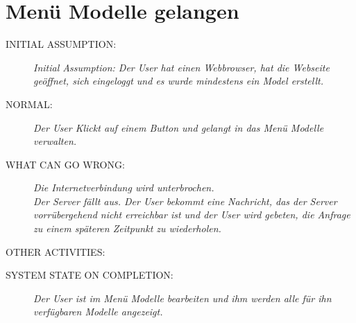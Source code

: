 {\section{Menü \gls{Model}le gelangen}
\begin{description}
  \item [INITIAL ASSUMPTION:]
    \textit{Initial Assumption: Der \gls{User} hat einen Webbrowser, hat die Webseite geöffnet, sich eingeloggt und es wurde mindestens ein \gls{Model} erstellt.}
  \item [NORMAL:]
    \textit{Der \gls{User} Klickt auf einem Button und gelangt in das Menü Modelle verwalten.}
  \item [WHAT CAN GO WRONG:]
    \textit{Die Internetverbindung wird unterbrochen.\\
Der Server fällt aus. Der \gls{User} bekommt eine Nachricht, das der Server vorrübergehend nicht erreichbar ist und der \gls{User} wird gebeten, die Anfrage zu einem späteren Zeitpunkt zu wiederholen.}
  \item [OTHER ACTIVITIES:]
    \textit{}
  \item [SYSTEM STATE ON COMPLETION:]
    \textit{Der \gls{User} ist im Menü \gls{Model}le bearbeiten und ihm werden alle für ihn verfügbaren \gls{Model}le angezeigt.}
\end{description}

}

